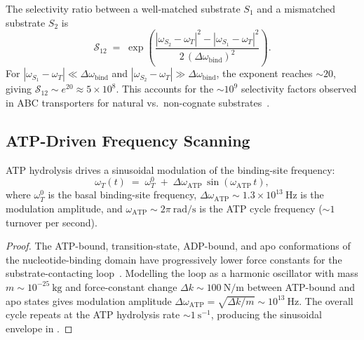 \begin{corollary}
\label{cor:ch03-selectivity-factor}
The selectivity ratio between a well-matched substrate $S_1$ and a
mismatched substrate $S_2$ is
\begin{equation}
    \mathcal{S}_{12}
    \;=\;
    \exp\!\left(
        \frac{|\omega_{S_2}-\omega_T|^2 - |\omega_{S_1}-\omega_T|^2}
             {2\,(\Delta\omega_{\mathrm{bind}})^2}
    \right).
    \label{eq:ch03-selectivity}
\end{equation}
For $|\omega_{S_1}-\omega_T|\ll\Delta\omega_{\mathrm{bind}}$ and
$|\omega_{S_2}-\omega_T|\gg\Delta\omega_{\mathrm{bind}}$, the exponent
reaches $\sim 20$, giving $\mathcal{S}_{12}\sim e^{20}\approx 5\times 10^8$.
This accounts for the $\sim 10^9$ selectivity factors observed in ABC
transporters for natural vs.\ non-cognate substrates~\citep{rees2009abc}.
\end{corollary}

\subsection{ATP-Driven Frequency Scanning}

\begin{theorem}
\label{thm:ch03-atp-scanning}
ATP hydrolysis drives a sinusoidal modulation of the binding-site frequency:
\begin{equation}
    \omega_T(t)
    \;=\;
    \omega_T^0
    \;+\;
    \Delta\omega_{\mathrm{ATP}}\,\sin(\omega_{\mathrm{ATP}}\,t),
    \label{eq:ch03-atp-scan}
\end{equation}
where $\omega_T^0$ is the basal binding-site frequency,
$\Delta\omega_{\mathrm{ATP}}\sim 1.3\times 10^{13}~\mathrm{Hz}$ is the
modulation amplitude, and $\omega_{\mathrm{ATP}}\sim 2\pi~\mathrm{rad/s}$
is the ATP cycle frequency ($\sim 1$ turnover per second).
\end{theorem}

\begin{proof}
The ATP-bound, transition-state, ADP-bound, and apo conformations of the
nucleotide-binding domain have progressively lower force constants for the
substrate-contacting loop~\citep{locher2016mechanistic}.  Modelling the loop
as a harmonic oscillator with mass $m\sim 10^{-25}~\mathrm{kg}$ and
force-constant change $\Delta k\sim 100~\mathrm{N/m}$ between ATP-bound
and apo states gives modulation amplitude
$\Delta\omega_{\mathrm{ATP}}=\sqrt{\Delta k/m}\sim 10^{13}~\mathrm{Hz}$.
The overall cycle repeats at the ATP hydrolysis rate
$\sim 1~\mathrm{s}^{-1}$, producing the sinusoidal envelope in
.
\end{proof}

